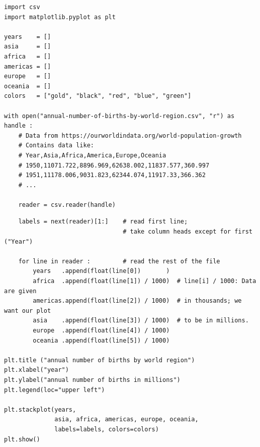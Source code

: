
\begin{frame}[fragile]
%
\begin{codebox}
\begin{verbatim}
import csv
import matplotlib.pyplot as plt

years    = []
asia     = []
africa   = []
americas = []
europe   = []
oceania  = []
colors   = ["gold", "black", "red", "blue", "green"]

with open("annual-number-of-births-by-world-region.csv", "r") as handle :
    # Data from https://ourworldindata.org/world-population-growth
    # Contains data like:
    # Year,Asia,Africa,America,Europe,Oceania
    # 1950,11071.722,8896.969,62638.002,11837.577,360.997
    # 1951,11178.006,9031.823,62344.074,11917.33,366.362
    # ...
      
    reader = csv.reader(handle)

\end{verbatim}
\end{codebox}
%
\end{frame}


\begin{frame}[fragile]
%
\begin{codebox}[... continued]
\begin{verbatim}
    labels = next(reader)[1:]    # read first line;
                                 # take column heads except for first ("Year")

    for line in reader :         # read the rest of the file
        years   .append(float(line[0])       )
        africa  .append(float(line[1]) / 1000)  # line[i] / 1000: Data are given
        americas.append(float(line[2]) / 1000)  # in thousands; we want our plot
        asia    .append(float(line[3]) / 1000)  # to be in millions.
        europe  .append(float(line[4]) / 1000)
        oceania .append(float(line[5]) / 1000)

plt.title ("annual number of births by world region")
plt.xlabel("year")
plt.ylabel("annual number of births in millions")
plt.legend(loc="upper left")

plt.stackplot(years,
              asia, africa, americas, europe, oceania,
              labels=labels, colors=colors)
plt.show()
\end{verbatim}
\end{codebox}
%
\end{frame}

